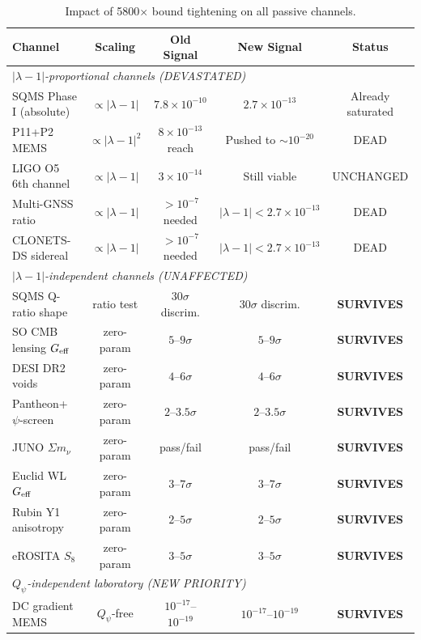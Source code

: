\documentclass[11pt]{article}
\newcommand{\ee}[1]{\times 10^{#1}}
\newcommand{\lbone}{|\lambda - 1|}
\newcommand{\Qpsi}{Q_\psi}
\begin{document}
\begin{table}[H]
\centering
\caption{Impact of 5800$\times$ bound tightening on all passive channels.}
\label{tab:impact}
\begin{tabular}{@{}lcccc@{}}
\toprule
Channel & Scaling & Old Signal & New Signal & Status \\
\midrule
\multicolumn{5}{l}{\textit{$\lbone$-proportional channels (DEVASTATED)}} \\
SQMS Phase I (absolute) & $\propto \lbone$ & $7.8\ee{-10}$ & $2.7\ee{-13}$ & Already saturated \\
P11+P2 MEMS & $\propto \lbone^2$ & $8\ee{-13}$ reach & Pushed to $\sim 10^{-20}$ & DEAD \\
LIGO O5 6th channel & $\propto \lbone$ & $3\ee{-14}$ & Still viable & UNCHANGED \\
Multi-GNSS ratio & $\propto \lbone$ & $>10^{-7}$ needed & $\lbone < 2.7\ee{-13}$ & DEAD \\
CLONETS-DS sidereal & $\propto \lbone$ & $>10^{-7}$ needed & $\lbone < 2.7\ee{-13}$ & DEAD \\
\midrule
\multicolumn{5}{l}{\textit{$\lbone$-independent channels (UNAFFECTED)}} \\
SQMS Q-ratio shape & ratio test & $30\sigma$ discrim. & $30\sigma$ discrim. & \textbf{SURVIVES} \\
SO CMB lensing $G_{\rm eff}$ & zero-param & $5$--$9\sigma$ & $5$--$9\sigma$ & \textbf{SURVIVES} \\
DESI DR2 voids & zero-param & $4$--$6\sigma$ & $4$--$6\sigma$ & \textbf{SURVIVES} \\
Pantheon+ $\psi$-screen & zero-param & $2$--$3.5\sigma$ & $2$--$3.5\sigma$ & \textbf{SURVIVES} \\
JUNO $\Sigma m_\nu$ & zero-param & pass/fail & pass/fail & \textbf{SURVIVES} \\
Euclid WL $G_{\rm eff}$ & zero-param & $3$--$7\sigma$ & $3$--$7\sigma$ & \textbf{SURVIVES} \\
Rubin Y1 anisotropy & zero-param & $2$--$5\sigma$ & $2$--$5\sigma$ & \textbf{SURVIVES} \\
eROSITA $S_8$ & zero-param & $3$--$5\sigma$ & $3$--$5\sigma$ & \textbf{SURVIVES} \\
\midrule
\multicolumn{5}{l}{\textit{$\Qpsi$-independent laboratory (NEW PRIORITY)}} \\
DC gradient MEMS & $\Qpsi$-free & $10^{-17}$--$10^{-19}$ & $10^{-17}$--$10^{-19}$ & \textbf{SURVIVES} \\
\bottomrule
\end{tabular}
\end{table}
\end{document}

